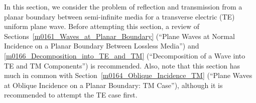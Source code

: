 

\label{m0167_Oblique_Incidence_TE} %

In this section, we consider the problem of reflection and transmission from a planar boundary between semi-infinite media for a transverse electric (TE) uniform plane wave.
Before attempting this section, a review of
Sections~\ref{m0161_Waves_at_Planar_Boundary} (``Plane Waves at Normal Incidence on a Planar Boundary Between Lossless Media'') and
\ref{m0166_Decomposition_into_TE_and_TM} (``Decomposition of a Wave into TE and TM Components'') is recommended.
Also, note that this section has much in common with Section~\ref{m0164_Oblique_Incidence_TM} (``Plane Waves at Oblique Incidence on a Planar Boundary: TM Case''), although it is recommended to attempt the TE case first.


